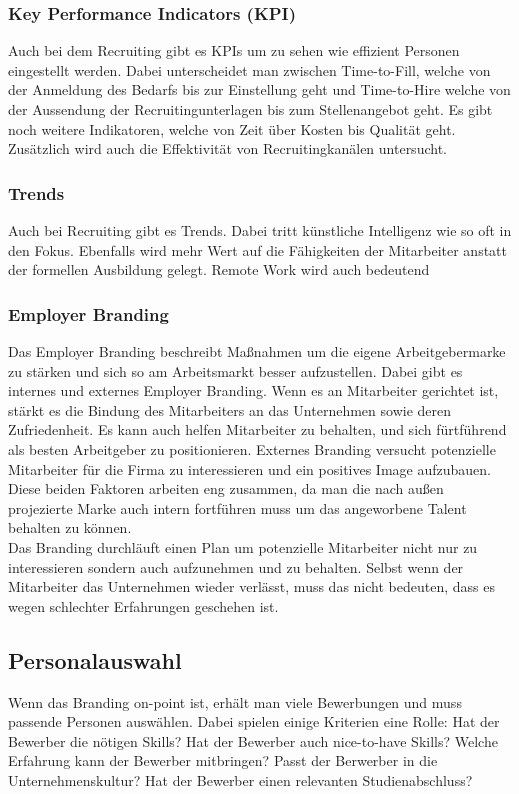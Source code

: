 \documentclass{article}
\begin{document}
	 \subsubsection{Key Performance Indicators (KPI)}
	 Auch bei dem Recruiting gibt es KPIs um zu sehen wie effizient Personen eingestellt werden. Dabei unterscheidet man zwischen Time-to-Fill, welche von der Anmeldung des Bedarfs bis zur Einstellung geht und Time-to-Hire welche von der Aussendung der Recruitingunterlagen bis zum Stellenangebot geht. Es gibt noch weitere Indikatoren, welche von Zeit über Kosten bis Qualität geht. Zusätzlich wird auch die Effektivität von Recruitingkanälen untersucht. \\
	 \subsubsection{Trends}
	 Auch bei Recruiting gibt es Trends. Dabei tritt künstliche Intelligenz wie so oft in den Fokus. Ebenfalls wird mehr Wert auf die Fähigkeiten der Mitarbeiter anstatt der formellen Ausbildung gelegt. Remote Work wird auch bedeutend
	 \subsubsection{Employer Branding}
	 Das Employer Branding beschreibt Maßnahmen um die eigene Arbeitgebermarke zu stärken und sich so am Arbeitsmarkt besser aufzustellen. Dabei gibt es internes und externes Employer Branding. Wenn es an Mitarbeiter gerichtet ist, stärkt es die Bindung des Mitarbeiters an das Unternehmen sowie deren Zufriedenheit. Es kann auch helfen Mitarbeiter zu behalten, und sich fürtführend als besten Arbeitgeber zu positionieren. Externes Branding versucht potenzielle Mitarbeiter für die Firma zu interessieren und ein positives Image aufzubauen. Diese beiden Faktoren arbeiten eng zusammen, da man die nach außen projezierte Marke auch intern fortführen muss um das angeworbene Talent behalten zu können. \\
	 Das Branding durchläuft einen Plan um potenzielle Mitarbeiter nicht nur zu interessieren sondern auch aufzunehmen und zu behalten. Selbst wenn der Mitarbeiter das Unternehmen wieder verlässt, muss das nicht bedeuten, dass es wegen schlechter Erfahrungen geschehen ist.
	 \subsection{Personalauswahl}
	 Wenn das Branding on-point ist, erhält man viele Bewerbungen und muss passende Personen auswählen. Dabei spielen einige Kriterien eine Rolle: Hat der Bewerber die nötigen Skills? Hat der Bewerber auch nice-to-have Skills? Welche Erfahrung kann der Bewerber mitbringen? Passt der Berwerber in die Unternehmenskultur? Hat der Bewerber einen relevanten Studienabschluss?
\end{document}
